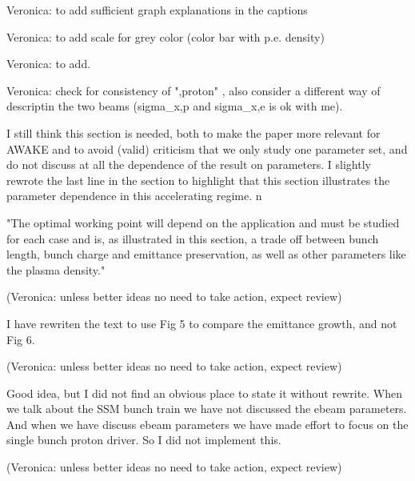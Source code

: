 

Veronica: to add sufficient graph explanations in the captions


Veronica: to add scale for grey color (color bar with p.e. density)


Veronica: to add.


Veronica: check for consistency of ",proton" , also consider a different way of descriptin the two beams (sigma_x,p and sigma_x,e is ok with me).


I still think this section is needed, both to make the paper more relevant for AWAKE and to avoid (valid) criticism that we only study one parameter set, and do not discuss at all the dependence of the result on parameters.  I slightly rewrote the last line in the section to highlight that this section illustrates the parameter dependence in this accelerating regime. n

"The optimal working point will depend on the application and must be studied for each case and is, as illustrated in this section, a trade off between bunch length, bunch charge and emittance preservation, as well as other parameters like the plasma density."

(Veronica: unless better ideas no need to take action, expect review)


I have rewriten the text to use Fig 5 to compare the emittance growth, and not Fig 6.

(Veronica: unless better ideas no need to take action, expect review)



Good idea, but I did not find an obvious place to state it without rewrite.  When we talk about the SSM bunch train we have not discussed the ebeam parameters.  And when we have discuss ebeam parameters we have made effort to focus on the single bunch proton driver.  So I did not implement this.

(Veronica: unless better ideas no need to take action, expect review)


